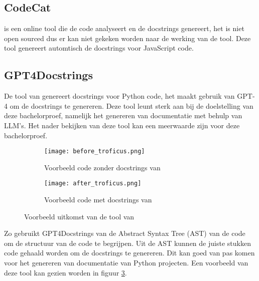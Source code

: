 \subsection{CodeCat}
\textcite{CodeCat2024} is een online tool die de code analyseert en de docstrings genereert, het is niet open sourced dus er kan niet gekeken worden naar de werking van de tool.
Deze tool genereert automtisch de docstrings voor JavaScript code.

\subsection{GPT4Docstrings}
De tool van \textcite{Trofficus2023} genereert docstrings voor Python code, het maakt gebruik van GPT-4 \autocite{OpenAI2023} om de docstrings te genereren.
Deze tool leunt sterk aan bij de doelstelling van deze bachelorproef, namelijk het genereren van documentatie met behulp van LLM's.
Het nader bekijken van deze tool kan een meerwaarde zijn voor deze bachelorproef.

\begin{figure}
  \centering
  \begin{subfigure}[b]{0.5\textwidth}
      \centering
      \texttt{[image: before\_troficus.png]}
      \caption{Voorbeeld code zonder docstrings van \textcite{Trofficus2023}}
      \label{fig:before-Trofficus}
  \end{subfigure}
  \hfill
  \begin{subfigure}[b]{0.5\textwidth}
      \centering
      \texttt{[image: after\_troficus.png]}
      \caption{Voorbeeld code met docstrings van \textcite{Trofficus2023}}
      \label{fig:after-Trofficus}
  \end{subfigure}
     \caption[Uitkomst GPT4Docstrings]{Voorbeeld uitkomst van de tool van \textcite{Trofficus2023}}
     \label{fig:Before-After-Trofficus}
\end{figure}

Zo gebruikt GPT4Docstrings van \textcite{Trofficus2023} de Abstract Syntax Tree (AST) van de code om de structuur van de code te begrijpen.
Uit de AST kunnen de juiste stukken code gehaald worden om de docstrings te genereren.
Dit kan goed van pas komen voor het genereren van documentatie van Python projecten.
Een voorbeeld van deze tool kan gezien worden in figuur \ref{fig:Before-After-Trofficus}. 

